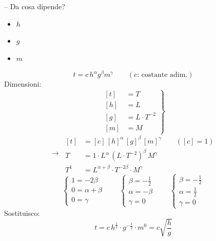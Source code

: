 \documentclass[11pt,a4paper,oneside]{book}
\begin{document}
\begin{esempio}{}{}
\leavevmode\par
\begin{minipage}[c]{0.38\linewidth}
\centering
{}
\end{minipage}\hfill
\begin{minipage}[c]{0.55\linewidth}
-- Da cosa dipende?
\begin{itemize}
  \item $h$
  \item $g$
  \item $m$
\end{itemize}
\end{minipage}
\[
  t = c\, h^{\alpha} g^{\beta} m^{\gamma} \qquad (c\text{: costante adim.})
\]
Dimensioni:
\[
  \left.
  \begin{aligned}
    [t] &= T \\
    [h] &= L \\
    [g] &= L \cdot T^{-2} \\
    [m] &= M
  \end{aligned}
  \right\}
\]
\[
  \to\
  \begin{aligned}
    [t] &= [c]\,[h]^{\alpha}\,[g]^{\beta}\,[m]^{\gamma} \qquad ([c] = 1)\\
    T &= 1 \cdot L^{\alpha} \,(L \cdot T^{-2})^{\beta}\, M^{\gamma} \\
    T^{1} &= L^{\alpha+\beta} \cdot T^{-2\beta} \cdot M^{\gamma}
  \end{aligned}
\]
\[
  \begin{cases}
    1 = -2\beta \\
    0 = \alpha + \beta \\
    0 = \gamma
  \end{cases}
  \qquad
  \begin{cases}
    \beta = -\frac{1}{2} \\
    \alpha = -\beta \\
    \gamma = 0
  \end{cases}
  \qquad
  \begin{cases}
    \beta = -\frac{1}{2} \\
    \alpha = \frac{1}{2} \\
    \gamma = 0
  \end{cases}
\]
Sostituisco:
\[
  t = c\, h^{\frac{1}{2}} \cdot g^{-\frac{1}{2}} \cdot m^{0} = c \sqrt{\frac{h}{g}}
\]
\end{esempio}
\end{document}
